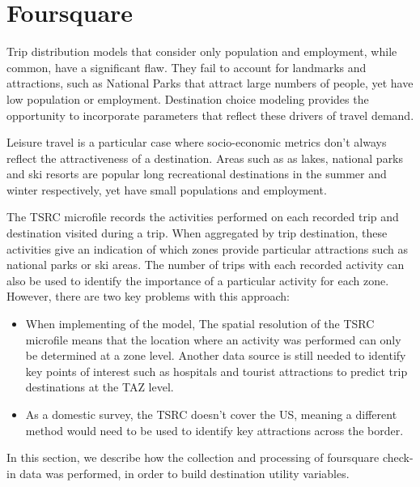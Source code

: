 \section{Foursquare}
\label{section:data-foursquare}
Trip distribution models that consider only population and employment, while common, have a significant flaw. They fail to account for landmarks and attractions, such as National Parks that attract large numbers of people, yet have low population or employment. Destination choice modeling provides the opportunity to incorporate parameters that reflect these drivers of travel demand. 
	
Leisure travel is a particular case where socio-economic metrics don't always reflect the attractiveness of a destination. Areas such as as lakes, national parks and ski resorts are popular long recreational destinations in the summer and winter respectively, yet have small populations and employment. 
	
The TSRC microfile records the activities performed on each recorded trip and destination visited during a trip. When aggregated by trip destination, these activities give an indication of which zones provide particular attractions such as national parks or ski areas. The number of trips with each recorded activity can also be used to identify the importance of a particular activity for each zone. However, there are two key problems with this approach:

\begin{itemize}
\item When implementing of the model,  The spatial resolution of the TSRC microfile means that the location where an activity was performed can only be determined at a zone level. Another data source is still needed to identify key points of interest such as hospitals and tourist attractions to predict trip destinations at the TAZ level.
\item As a domestic survey, the TSRC doesn't cover the US, meaning a different method would need to be used to identify key attractions across the border.
\end{itemize}	
In this section, we describe how the collection and processing of foursquare check-in data was performed, in order to build destination utility variables.

